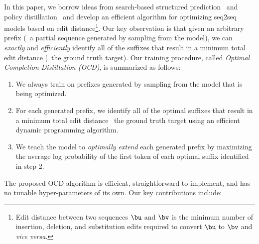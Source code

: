 In this paper, we borrow ideas from search-based structured prediction~\citep{daumeetal09,ross-aistats-2011}
and policy distillation~\citep{rusu-iclr-2016} and develop an efficient algorithm for optimizing seq2seq models
based on edit distance\footnote{Edit distance between two sequences $\bu$ and $\bv$ is the minimum number of insertion,
deletion, and substitution edits required to convert $\bu$ to $\bv$ and {\em vice versa}.}. Our key observation is that
given an arbitrary prefix (\eg~a partial sequence generated by sampling from the model), we can {\em exactly} and {\em efficiently}
identify all of the suffixes that result in a minimum total edit distance (\vs~the ground truth target). Our training procedure,
called {\em Optimal Completion Distillation (OCD)}, is summarized as follows:
\begin{enumerate}[noitemsep,parsep=0pt,leftmargin=7mm]
    \item We always train on prefixes generated by sampling from the model that is being optimized.
    \item For each generated prefix, we identify all of the optimal suffixes that
    result in a minimum total edit distance \vs~the ground truth target using an efficient dynamic programming algorithm.
    \item We teach the model to {\em optimally extend} each generated prefix
    by maximizing the average log probability of the first token of each optimal suffix identified in step 2.
\end{enumerate}
 The proposed OCD algorithm is efficient,
straightforward to implement, and has no tunable hyper-parameters of its own.
Our key contributions include:
